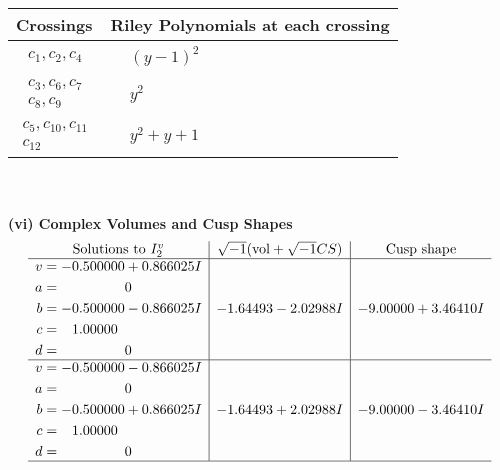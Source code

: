 \documentclass[1p]{elsarticle_modified}
\theoremstyle{definition}
\newcommand{\I}{\sqrt{-1}}
\begin{document}
\begin{tabular}{m{50pt}|m{274pt}}
Crossings & \hspace{64pt}Riley Polynomials at each crossing \\
\hline $$\begin{aligned}c_{1},c_{2},c_{4}\end{aligned}$$&$\begin{aligned}
&(y-1)^2
\end{aligned}$\\
\hline $$\begin{aligned}c_{3},c_{6},c_{7}\\c_{8},c_{9}\end{aligned}$$&$\begin{aligned}
&y^2
\end{aligned}$\\
\hline $$\begin{aligned}c_{5},c_{10},c_{11}\\c_{12}\end{aligned}$$&$\begin{aligned}
&y^2+y+1
\end{aligned}$\\
\hline
\end{tabular}\\~\\
\newpage\flushleft \textbf{(vi) Complex Volumes and Cusp Shapes}
$$\begin{array}{c|c|c}  
\text{Solutions to }I^v_{2}& \I (\text{vol} + \sqrt{-1}CS) & \text{Cusp shape}\\
 \hline 
\begin{aligned}
v &= -0.500000 + 0.866025 I \\
a &= \phantom{-0.000000 } 0 \\
b &= -0.500000 - 0.866025 I \\
c &= \phantom{-}1.00000\phantom{ +0.000000I} \\
d &= \phantom{-0.000000 } 0\end{aligned}
 & -1.64493 - 2.02988 I & -9.00000 + 3.46410 I \\ \hline\begin{aligned}
v &= -0.500000 - 0.866025 I \\
a &= \phantom{-0.000000 } 0 \\
b &= -0.500000 + 0.866025 I \\
c &= \phantom{-}1.00000\phantom{ +0.000000I} \\
d &= \phantom{-0.000000 } 0\end{aligned}
 & -1.64493 + 2.02988 I & -9.00000 - 3.46410 I\\
 \hline 
 \end{array}$$\newpage\newpage\renewcommand{\arraystretch}{1}
\end{document}
